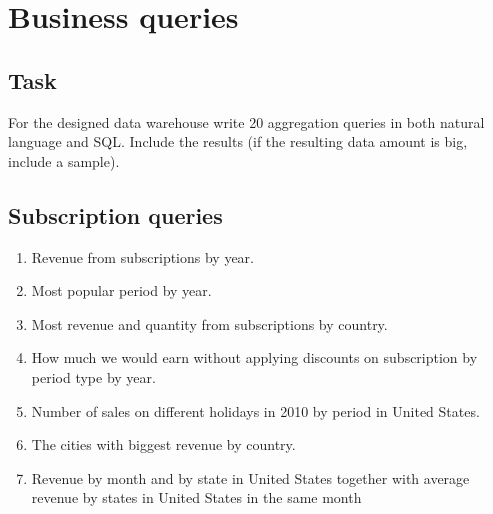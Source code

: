 \section{Business queries} %
\label{sub:Business queries}

\subsection*{Task} %
\label{sub:name}
For the designed data warehouse write 20 aggregation queries in both natural language and SQL. Include the results (if the resulting data amount is big, include a sample).

\subsection*{Subscription queries} %
\label{sub:Subscription business queries}
\begin{enumerate}
  \item Revenue from subscriptions by year.
  \item Most popular period by year.
  \item Most revenue and quantity from subscriptions by country.
  \item How much we would earn without applying discounts on subscription by period type  by year.
  \item Number of sales on different holidays in 2010 by period in United States.
  \item The cities with biggest revenue by country.
  \item Revenue by month and by  state in United States together with average revenue by states in United States in the same month
\end{enumerate}

